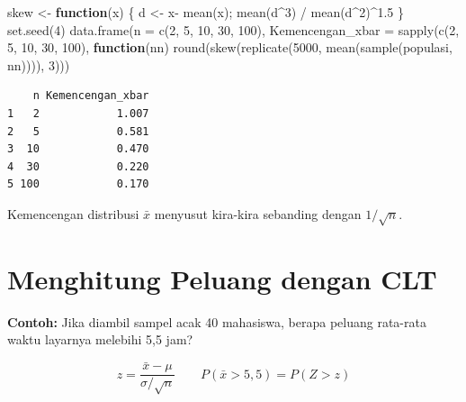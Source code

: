 \documentclass[
  indonesian,
  letterpaper,
]{book}
\newenvironment{Shaded}{\begin{snugshade}}{\end{snugshade}}
\newcommand{\AttributeTok}[1]{\textcolor[rgb]{0.40,0.45,0.13}{#1}}
\newcommand{\ControlFlowTok}[1]{\textcolor[rgb]{0.00,0.23,0.31}{\textbf{#1}}}
\newcommand{\DecValTok}[1]{\textcolor[rgb]{0.68,0.00,0.00}{#1}}
\newcommand{\FloatTok}[1]{\textcolor[rgb]{0.68,0.00,0.00}{#1}}
\newcommand{\FunctionTok}[1]{\textcolor[rgb]{0.28,0.35,0.67}{#1}}
\newcommand{\NormalTok}[1]{\textcolor[rgb]{0.00,0.23,0.31}{#1}}
\newcommand{\OtherTok}[1]{\textcolor[rgb]{0.00,0.23,0.31}{#1}}
\newcommand{\SpecialCharTok}[1]{\textcolor[rgb]{0.37,0.37,0.37}{#1}}
\begin{document}
\begin{Shaded}
\begin{Highlighting}[]
\NormalTok{skew }\OtherTok{\textless{}{-}} \ControlFlowTok{function}\NormalTok{(x) \{ d }\OtherTok{\textless{}{-}}\NormalTok{ x}\SpecialCharTok{{-}} \FunctionTok{mean}\NormalTok{(x); }\FunctionTok{mean}\NormalTok{(d}\SpecialCharTok{\^{}}\DecValTok{3}\NormalTok{) }\SpecialCharTok{/} \FunctionTok{mean}\NormalTok{(d}\SpecialCharTok{\^{}}\DecValTok{2}\NormalTok{)}\SpecialCharTok{\^{}}\FloatTok{1.5}\NormalTok{ \}}
\FunctionTok{set.seed}\NormalTok{(}\DecValTok{4}\NormalTok{)}
\FunctionTok{data.frame}\NormalTok{(}\AttributeTok{n =} \FunctionTok{c}\NormalTok{(}\DecValTok{2}\NormalTok{, }\DecValTok{5}\NormalTok{, }\DecValTok{10}\NormalTok{, }\DecValTok{30}\NormalTok{, }\DecValTok{100}\NormalTok{),}
\AttributeTok{Kemencengan\_xbar =} \FunctionTok{sapply}\NormalTok{(}\FunctionTok{c}\NormalTok{(}\DecValTok{2}\NormalTok{, }\DecValTok{5}\NormalTok{, }\DecValTok{10}\NormalTok{, }\DecValTok{30}\NormalTok{, }\DecValTok{100}\NormalTok{), }\ControlFlowTok{function}\NormalTok{(nn)}
\FunctionTok{round}\NormalTok{(}\FunctionTok{skew}\NormalTok{(}\FunctionTok{replicate}\NormalTok{(}\DecValTok{5000}\NormalTok{, }\FunctionTok{mean}\NormalTok{(}\FunctionTok{sample}\NormalTok{(populasi, nn)))), }\DecValTok{3}\NormalTok{)))}
\end{Highlighting}
\end{Shaded}

\begin{verbatim}
    n Kemencengan_xbar
1   2            1.007
2   5            0.581
3  10            0.470
4  30            0.220
5 100            0.170
\end{verbatim}

Kemencengan distribusi \(\bar{x}\) menyusut kira-kira sebanding dengan
\(1/\sqrt{n}\).

\section{Menghitung Peluang dengan
CLT}\label{menghitung-peluang-dengan-clt}

\textbf{Contoh:} Jika diambil sampel acak 40 mahasiswa, berapa peluang
rata-rata waktu layarnya melebihi 5,5 jam?

\[z = \frac{\bar{x} - \mu}{\sigma / \sqrt{n}} \qquad P(\bar{x} > 5,5) = P(Z > z)\]
\end{document}
